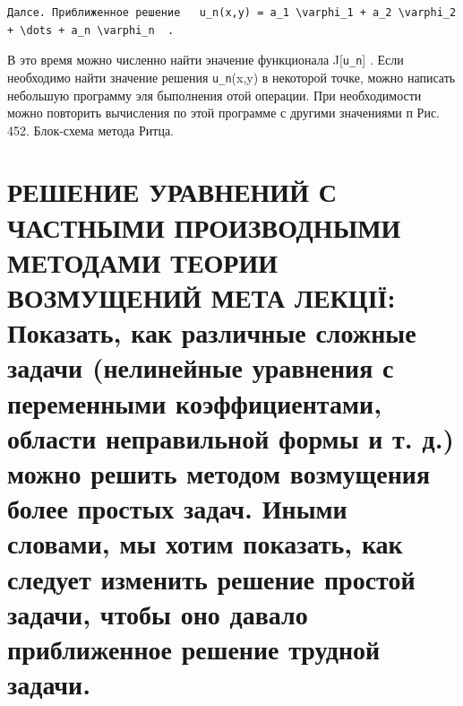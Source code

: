 \documentclass[
  ukrainian,
]{article}
\begin{document}
\begin{verbatim}
Далсе. Приближенное решение   u_n(x,y) = a_1 \varphi_1 + a_2 \varphi_2 + \dots + a_n \varphi_n  .
\end{verbatim}

В это время можно численно найти эначение функционала
J{[}\texttt{u\_n}{]} . Если необходимо найти значение решения
\texttt{u\_n}(x,y) в некоторой точке, можно написать небольшую программу
эля быполнения отой операции. При необходимости можно повторить
вычисления по этой программе с другими значениями п Рис. 452. Блок-схема
метода Ритца.

\section{РЕШЕНИЕ УРАВНЕНИЙ С ЧАСТНЫМИ ПРОИЗВОДНЫМИ МЕТОДАМИ ТЕОРИИ
ВОЗМУЩЕНИЙ МЕТА ЛЕКЦІЇ: Показать, как различные сложные задачи
(нелинейные уравнения с переменными коэффициентами, области неправильной
формы и т. д.) можно решить методом возмущения более простых задач.
Иными словами, мы хотим показать, как следует изменить решение простой
задачи, чтобы оно давало приближенное решение трудной
задачи.}\label{ux440ux435ux448ux435ux43dux438ux435-ux443ux440ux430ux432ux43dux435ux43dux438ux439-ux441-ux447ux430ux441ux442ux43dux44bux43cux438-ux43fux440ux43eux438ux437ux432ux43eux434ux43dux44bux43cux438-ux43cux435ux442ux43eux434ux430ux43cux438-ux442ux435ux43eux440ux438ux438-ux432ux43eux437ux43cux443ux449ux435ux43dux438ux439-ux43cux435ux442ux430-ux43bux435ux43aux446ux456ux457-ux43fux43eux43aux430ux437ux430ux442ux44c-ux43aux430ux43a-ux440ux430ux437ux43bux438ux447ux43dux44bux435-ux441ux43bux43eux436ux43dux44bux435-ux437ux430ux434ux430ux447ux438-ux43dux435ux43bux438ux43dux435ux439ux43dux44bux435-ux443ux440ux430ux432ux43dux435ux43dux438ux44f-ux441-ux43fux435ux440ux435ux43cux435ux43dux43dux44bux43cux438-ux43aux43eux44dux444ux444ux438ux446ux438ux435ux43dux442ux430ux43cux438-ux43eux431ux43bux430ux441ux442ux438-ux43dux435ux43fux440ux430ux432ux438ux43bux44cux43dux43eux439-ux444ux43eux440ux43cux44b-ux438-ux442.-ux434.-ux43cux43eux436ux43dux43e-ux440ux435ux448ux438ux442ux44c-ux43cux435ux442ux43eux434ux43eux43c-ux432ux43eux437ux43cux443ux449ux435ux43dux438ux44f-ux431ux43eux43bux435ux435-ux43fux440ux43eux441ux442ux44bux445-ux437ux430ux434ux430ux447.-ux438ux43dux44bux43cux438-ux441ux43bux43eux432ux430ux43cux438-ux43cux44b-ux445ux43eux442ux438ux43c-ux43fux43eux43aux430ux437ux430ux442ux44c-ux43aux430ux43a-ux441ux43bux435ux434ux443ux435ux442-ux438ux437ux43cux435ux43dux438ux442ux44c-ux440ux435ux448ux435ux43dux438ux435-ux43fux440ux43eux441ux442ux43eux439-ux437ux430ux434ux430ux447ux438-ux447ux442ux43eux431ux44b-ux43eux43dux43e-ux434ux430ux432ux430ux43bux43e-ux43fux440ux438ux431ux43bux438ux436ux435ux43dux43dux43eux435-ux440ux435ux448ux435ux43dux438ux435-ux442ux440ux443ux434ux43dux43eux439-ux437ux430ux434ux430ux447ux438.}
\end{document}
